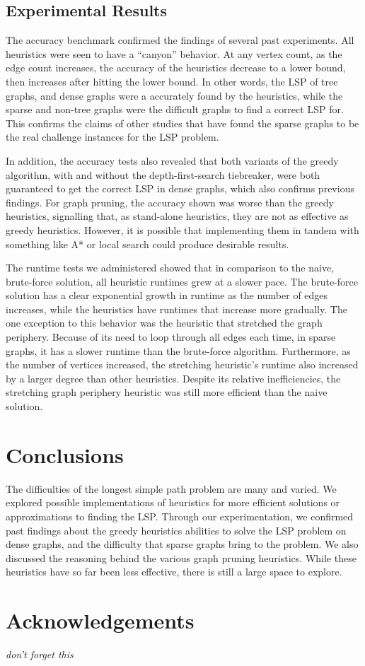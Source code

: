 \documentclass[twocolumn,showpacs,%
  nofootinbib,aps,superscriptaddress,%
  eqsecnum,prd,notitlepage,showkeys,11pt]{article}
\begin{document}
\subsection{Experimental Results}

The accuracy benchmark confirmed the findings of several past experiments. All heuristics were seen to have a ``canyon'' behavior. At any vertex count, as the edge count increases, the accuracy of the heuristics decrease to a lower bound, then increases after hitting the lower bound. In other words, the LSP of tree graphs, and dense graphs were a accurately found by the heuristics, while the sparse and non-tree graphs were the difficult graphs to find a correct LSP for. This confirms the claims of other studies that have found the sparse graphs to be the real challenge instances for the LSP problem. 

In addition, the accuracy tests also revealed that both variants of the greedy algorithm, with and without the depth-first-search tiebreaker, were both guaranteed to get the correct LSP in dense graphs, which also confirms previous findings. For graph pruning, the accuracy shown was worse than the greedy heuristics, signalling that, as stand-alone heuristics, they are not as effective as greedy heuristics. However, it is possible that implementing them in tandem with something like A* or local search could produce desirable results.

The runtime tests we administered showed that in comparison to the naive, brute-force solution, all heuristic runtimes grew at a slower pace. The brute-force solution has a clear exponential growth in runtime as the number of edges increases, while the heuristics have runtimes that increase more gradually. The one exception to this behavior was the heuristic that stretched the graph periphery. Because of its need to loop through all edges each time, in sparse graphs, it has a slower runtime than the brute-force algorithm. Furthermore, as the number of vertices increased, the stretching heuristic's runtime also increased by a larger degree than other heuristics. Despite its relative inefficiencies, the stretching graph periphery heuristic was still more efficient than the naive solution.

\section{Conclusions}

The difficulties of the longest simple path problem are many and varied.
We explored possible implementations of heuristics for more efficient solutions or approximations to finding the LSP. Through our experimentation, we confirmed past findings about the greedy heuristics abilities to solve the LSP problem on dense graphs, and the difficulty that sparse graphs bring to the problem. We also discussed the reasoning behind the various graph pruning heuristics. While these heuristics have so far been less effective, there is still a large space to explore.

\section*{Acknowledgements}

{\em don't forget this}



\end{document}
